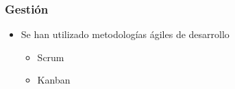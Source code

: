\begin{frame}
	\frametitle{Gesti\'on}
	
	\begin{itemize}
		\item Se han utilizado metodolog\'ias \'agiles de desarrollo
		\begin{itemize}
			\item Scrum
			\item Kanban
		\end{itemize}
	\end{itemize}
	
\end{frame}

